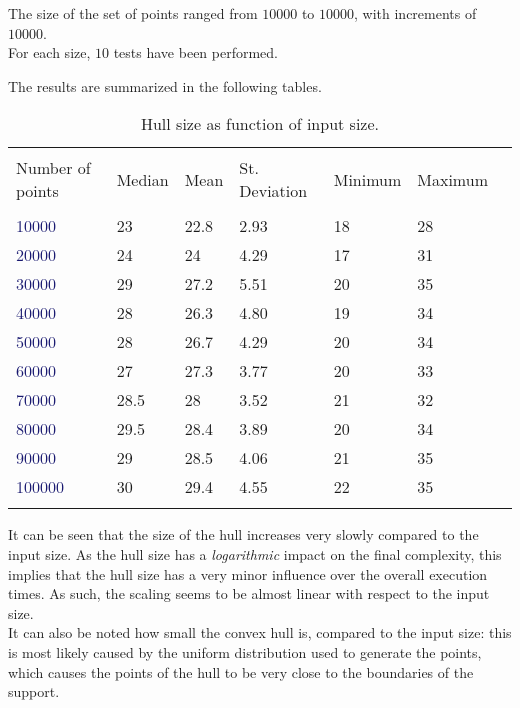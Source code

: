 \documentclass[
12pt,
a4paper,
oneside,
headinclude,
footinclude]{report}
\theoremstyle{definition} %
\begin{document}
The size of the set of points ranged from $10000$ to $10000$, with increments of $10000$.\\ 
For each size, $10$ tests have been performed.

The results are summarized in the following tables.


\begin{table}[h]
	\centering %
	
	\begin{tabular}{l l l l l l l} %
		\hline
		\hline 
		\\[-1.5ex]
		\textcolor{BrickRed}{Number of points} & \textcolor{BrickRed}{Median} & \textcolor{BrickRed}{Mean} & \textcolor{BrickRed}{St. Deviation} & \textcolor{BrickRed}{Minimum} & \textcolor{BrickRed}{Maximum}\\ [0.5ex]
		\hline %
		\\[-1.5ex]		
	\textcolor{MidnightBlue}{10000} & 23 & 22.8 & 2.93 & 18 & 28\\
	\textcolor{MidnightBlue}{20000} & 24 & 24 & 4.29 & 17 & 31\\
	\textcolor{MidnightBlue}{30000} & 29 & 27.2 & 5.51 & 20 & 35\\
	\textcolor{MidnightBlue}{40000} & 28 & 26.3 & 4.80 & 19 & 34\\
	\textcolor{MidnightBlue}{50000} & 28 & 26.7 & 4.29 & 20 & 34\\
	\textcolor{MidnightBlue}{60000} & 27 & 27.3 & 3.77 & 20 & 33\\
	\textcolor{MidnightBlue}{70000} & 28.5 & 28 & 3.52 & 21 & 32\\
	\textcolor{MidnightBlue}{80000} & 29.5 & 28.4 & 3.89 & 20 & 34\\
	\textcolor{MidnightBlue}{90000}& 29 & 28.5 & 4.06 & 21 & 35\\
	\textcolor{MidnightBlue}{100000} & 30 & 29.4 & 4.55 & 22 & 35\\[1ex]

		
		\hline %
		\caption{Hull size as function of input size.}
	\end{tabular}
\end{table}

It can be seen that the size of the hull increases very slowly compared to the input size. As the hull size has a \textit{logarithmic} impact on the final complexity, this implies that the hull size has a very minor influence over the overall execution times. As such, the scaling seems to be almost linear with respect to the input size.\\
It can also be noted how small the convex hull is, compared to the input size: this is most likely caused by the uniform distribution used to generate the points, which causes the points of the hull to be very close to the boundaries of the support. 
\end{document}
